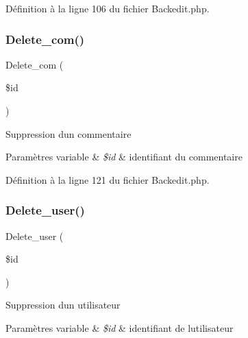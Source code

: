 Définition à la ligne 106 du fichier Backedit.\+php.

\mbox{\label{class_src_1_1_controllers_1_1_backedit_a38147e014898a3417c74b23e903621b0}} 
\subsubsection{\texorpdfstring{Delete\+\_\+com()}{Delete\_com()}}
{\footnotesize\ttfamily Delete\+\_\+com (\begin{DoxyParamCaption}\item[{}]{\$id }\end{DoxyParamCaption})}

Suppression d\textquotesingle{}un commentaire 
\begin{DoxyParams}[1]{Paramètres}
variable & {\em \$id} & identifiant du commentaire \\
\hline
\end{DoxyParams}


Définition à la ligne 121 du fichier Backedit.\+php.

\mbox{\label{class_src_1_1_controllers_1_1_backedit_ac8f9af14ff73b939d55940eb2ff886ee}} 
\subsubsection{\texorpdfstring{Delete\+\_\+user()}{Delete\_user()}}
{\footnotesize\ttfamily Delete\+\_\+user (\begin{DoxyParamCaption}\item[{}]{\$id }\end{DoxyParamCaption})}

Suppression d\textquotesingle{}un utilisateur 
\begin{DoxyParams}[1]{Paramètres}
variable & {\em \$id} & identifiant de l\textquotesingle{}utilisateur \\
\hline
\end{DoxyParams}


